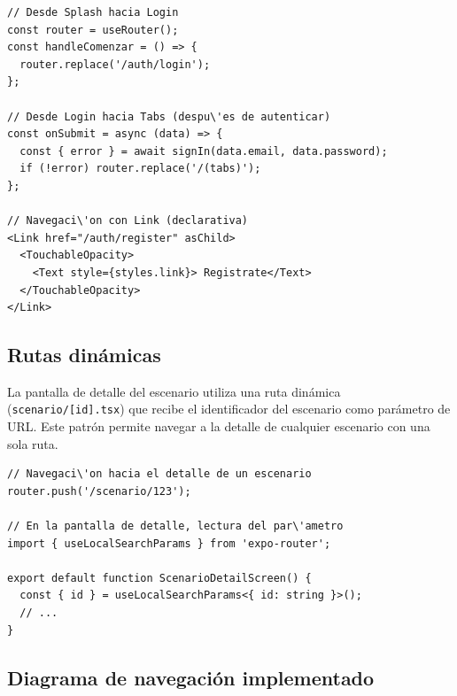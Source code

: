 \begin{lstlisting}
// Desde Splash hacia Login
const router = useRouter();
const handleComenzar = () => {
  router.replace('/auth/login');
};

// Desde Login hacia Tabs (despu\'es de autenticar)
const onSubmit = async (data) => {
  const { error } = await signIn(data.email, data.password);
  if (!error) router.replace('/(tabs)');
};

// Navegaci\'on con Link (declarativa)
<Link href="/auth/register" asChild>
  <TouchableOpacity>
    <Text style={styles.link}> Registrate</Text>
  </TouchableOpacity>
</Link>
\end{lstlisting}

\subsection{Rutas din\'amicas}

La pantalla de detalle del escenario utiliza una ruta din\'amica
(\texttt{scenario/[id].tsx}) que recibe el identificador del escenario como
par\'ametro de URL. Este patr\'on permite navegar a la detalle de cualquier
escenario con una sola ruta.

\begin{lstlisting}
// Navegaci\'on hacia el detalle de un escenario
router.push('/scenario/123');

// En la pantalla de detalle, lectura del par\'ametro
import { useLocalSearchParams } from 'expo-router';

export default function ScenarioDetailScreen() {
  const { id } = useLocalSearchParams<{ id: string }>();
  // ...
}
\end{lstlisting}

\subsection{Diagrama de navegaci\'on implementado}

